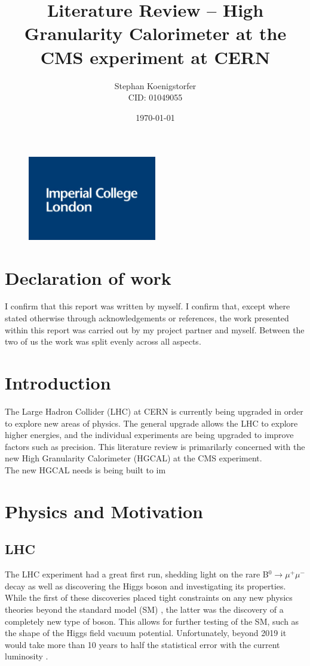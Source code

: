 \documentclass[12 pt]{article}
\title{Literature Review – High Granularity Calorimeter at the CMS experiment at CERN}
\date{\today}
\author{Stephan Koenigstorfer \\ CID: 01049055}
\begin{document}
	
	\maketitle
	\begin{figure}[H]
		\centering
		\includegraphics[width=0.5\textwidth]{imperial_logo.png}
	\end{figure}
	
	\newpage
	
	\section*{Declaration of work}
		I confirm that this report was written by myself. I confirm that, except where stated otherwise through acknowledgements or references, the work presented within this report was carried out by my project partner and myself. Between the two of us the work was split evenly across all aspects. 
	\tableofcontents

	\newpage


	\begin{abstract}
	\end{abstract}

	\section{Introduction}
		The Large Hadron Collider (LHC) at CERN is currently being upgraded in order to explore new areas of physics. The general upgrade allows the LHC to explore higher energies, and the individual experiments are being upgraded to improve factors such as precision. This literature review is primarilarly concerned with the new High Granularity Calorimeter (HGCAL) at the CMS experiment. \\
		The new HGCAL needs is being built to im
	\section{Physics and Motivation}
		\subsection{LHC}
			The LHC experiment had a great first run, shedding light on the rare B$^0 \rightarrow \mu^+ \mu^-$ \cite{B0} decay as well as discovering the Higgs boson and investigating its properties. While the first of these discoveries placed tight constraints on any new physics theories beyond the standard model (SM) \cite{mot}, the latter was the discovery of a completely new type of boson. This allows for further testing of the SM, such as the shape of the Higgs field vacuum potential. Unfortunately, beyond 2019 it would take more than 10 years to half the statistical error with the current luminosity \cite{mot}.\\
\end{document}
